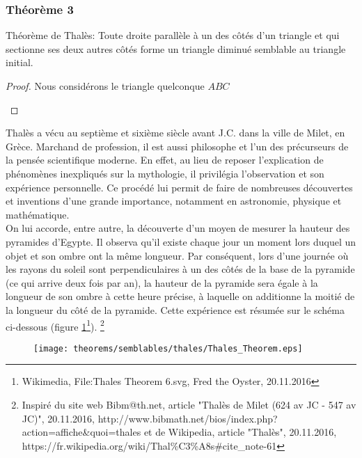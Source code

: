 \documentclass[a4paper,12pt]{article}
\begin{document}
\pagebreak
\subsubsection{Théorème 3}
\begin{theorem}
Théorème de Thalès: Toute droite parallèle à un des côtés d'un triangle et qui sectionne ses deux autres côtés forme un triangle diminué semblable au triangle initial.
\end{theorem}

\begin{proof}
Nous considérons le triangle quelconque $ABC$ 
\begin{hyp}

\end{hyp}
\begin{concl}

\end{concl}


\end{proof}





\begin{remark}
Thalès a vécu au septième et sixième siècle avant J.C. dans la ville de Milet, en Grèce. Marchand de profession, il est aussi philosophe et l'un des précurseurs de la pensée scientifique moderne. En effet, au lieu de reposer l'explication de phénomènes inexpliqués sur la mythologie, il privilégia l'observation et son expérience personnelle. Ce procédé lui permit de faire de nombreuses découvertes et inventions d'une grande importance, notamment en astronomie, physique et mathématique.\\

On lui accorde, entre autre, la découverte d'un moyen de mesurer la hauteur des pyramides d'Egypte. Il observa qu'il existe chaque jour un moment lors duquel un objet et son ombre ont la même longueur. Par conséquent, lors d'une journée où les rayons du soleil sont perpendiculaires à un des côtés de la base de la pyramide (ce qui arrive deux fois par an), la hauteur de la pyramide sera égale à la longueur de son ombre à cette heure précise, à laquelle on additionne la moitié de la longueur du côté de la pyramide. Cette expérience est résumée sur le schéma ci-dessous (figure \ref{fig:thales}\footnote{Wikimedia, File:Thales Theorem 6.svg, Fred the Oyster, 20.11.2016}).
\footnote{Inspiré du site web Bibm@th.net, article "Thalès de Milet (624 av JC - 547 av JC)", 20.11.2016, http://www.bibmath.net/bios/index.php?action=affiche\&quoi=thales et de Wikipedia, article "Thalès", 20.11.2016, https://fr.wikipedia.org/wiki/Thal\%C3\%A8s\#cite\_note-61}


\begin{figure}[H]
    \centering
    \texttt{[image: theorems/semblables/thales/Thales\_Theorem.eps]}
    
    \caption{}
    \label{fig:thales}
\end{figure}
\end{remark}
\end{document}
